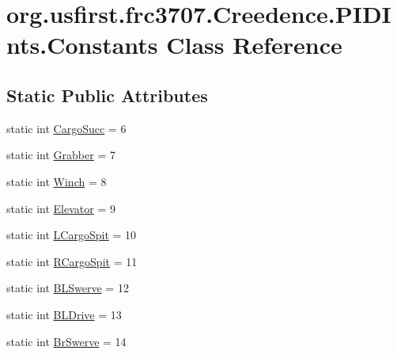 \hypertarget{classorg_1_1usfirst_1_1frc3707_1_1_creedence_1_1_p_i_d_ints_1_1_constants}{}\section{org.\+usfirst.\+frc3707.\+Creedence.\+P\+I\+D\+Ints.\+Constants Class Reference}
\label{classorg_1_1usfirst_1_1frc3707_1_1_creedence_1_1_p_i_d_ints_1_1_constants}
\subsection*{Static Public Attributes}
\begin{DoxyCompactItemize}
\item 
static int \mbox{\hyperlink{classorg_1_1usfirst_1_1frc3707_1_1_creedence_1_1_p_i_d_ints_1_1_constants_a5e9ab521965cf25c9c9bff0dd706f7f7}{Cargo\+Succ}} = 6
\item 
static int \mbox{\hyperlink{classorg_1_1usfirst_1_1frc3707_1_1_creedence_1_1_p_i_d_ints_1_1_constants_a954200603a7168f28f245fd33f8d9387}{Grabber}} = 7
\item 
static int \mbox{\hyperlink{classorg_1_1usfirst_1_1frc3707_1_1_creedence_1_1_p_i_d_ints_1_1_constants_aebf614887880e7e619372057fa6770c0}{Winch}} = 8
\item 
static int \mbox{\hyperlink{classorg_1_1usfirst_1_1frc3707_1_1_creedence_1_1_p_i_d_ints_1_1_constants_a716f8f1173cf7bb9d4f190f8bebcae7b}{Elevator}} = 9
\item 
static int \mbox{\hyperlink{classorg_1_1usfirst_1_1frc3707_1_1_creedence_1_1_p_i_d_ints_1_1_constants_a632d9ebb9ba67f0daae2ef2c05b3fa25}{L\+Cargo\+Spit}} = 10
\item 
static int \mbox{\hyperlink{classorg_1_1usfirst_1_1frc3707_1_1_creedence_1_1_p_i_d_ints_1_1_constants_a70a2bfbcb91a2c1ad0236042a1ce1c72}{R\+Cargo\+Spit}} = 11
\item 
static int \mbox{\hyperlink{classorg_1_1usfirst_1_1frc3707_1_1_creedence_1_1_p_i_d_ints_1_1_constants_a937c833e67b7a6b21846d7fcba45b462}{B\+L\+Swerve}} = 12
\item 
static int \mbox{\hyperlink{classorg_1_1usfirst_1_1frc3707_1_1_creedence_1_1_p_i_d_ints_1_1_constants_a87bc8749571a703f75883bcd0c9639e5}{B\+L\+Drive}} = 13
\item 
static int \mbox{\hyperlink{classorg_1_1usfirst_1_1frc3707_1_1_creedence_1_1_p_i_d_ints_1_1_constants_a4effb9c8562b96743405e105d8bce4a4}{Br\+Swerve}} = 14

\end{DoxyCompactItemize}
